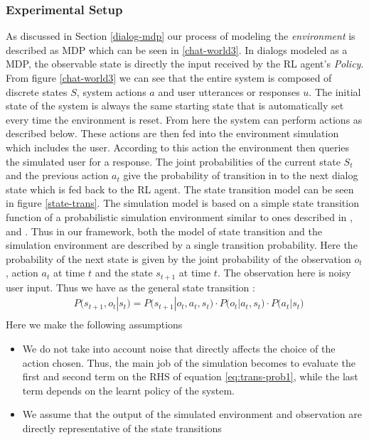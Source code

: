 \documentclass[12pt]{extarticle}
\numberwithin{equation}{section}
\begin{document}
	\subsubsection{Experimental Setup}\label{expt-setup}
	As discussed in Section \ref{dialog-mdp} our process of modeling the \textit{environment} is described as MDP which can be seen in \ref{chat-world3}. In dialogs modeled as a MDP, the observable state is directly the input received by the RL agent's \textit{Policy}. From figure \ref{chat-world3} we can see that the entire system is composed of discrete states $S$, system actions $a$ and user utterances or responses $u$. The initial state of the system is always the same starting state that is automatically set every time the environment is reset. From here the system can perform actions as described below. These actions are then fed into the environment simulation which includes the user. According to this action the environment then queries the simulated user for a response. The joint probabilities of the current state $S_t$	and the previous action $a_t$ give the probability of transition in to the next dialog state which is fed back to the RL agent. The state transition model can be seen in figure \ref{state-trans}. The simulation model is based on a simple state transition function of a probabilistic simulation environment similar to ones described in \cite{Singh_mdp}, \cite{walker2000evaluation} and \cite{roy2000spoken}. Thus in our framework, both the model of state transition and the simulation environment are described by a single transition probability. Here the probability of the next state is given by the joint probability of the observation $o_t$, action $a_t$ at time $t$ and the state $s_{t+1}$ at time $t$. The observation here is noisy user input. Thus we have as the general state transition :
	\begin{align}\label{eq:trans-prob1}
	&P\big(s_{t+1},o_t | s_t\big) = P\big(s_{t+1} | o_t,a_t,s_t \big)\cdot P\big(o_t | a_t,s_t\big)\cdot P\big(a_t | s_t\big) \nonumber\\
	\end{align}
	Here we make the following assumptions
	\begin{itemize}
		\item We do not take into account noise that directly affects the choice of the action chosen. Thus, the main job of the simulation becomes to evaluate the first and second term on the RHS of equation \ref{eq:trans-prob1}, while the last term depends on the learnt policy of the system.
		\item We assume that the output of the simulated environment and observation are directly representative of the state transitions
	\end{itemize}
\end{document}
